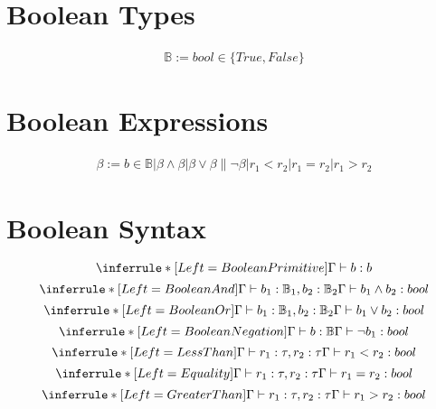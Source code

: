\documentclass{article}
\begin{document}
    \section{Boolean Types}
        \begin{align*}
            \mathbb{B} := bool \in \{True, False\}
        \end{align*}
    \section{Boolean Expressions}
        \begin{align*}
            \beta := b \in \mathbb{B}| \beta \wedge \beta|\beta \vee \beta\|\neg \beta|r_1 < r_2|r_1 = r_2|r_1 > r_2
        \end{align*}
    \section{Boolean Syntax}
        $$\inferrule*[Left=Boolean Primitive]{ }{\Gamma \vdash b:b}$$
        $$\inferrule*[Left=Boolean And]{\Gamma \vdash b_1:\mathbb{B}_1, b_2:\mathbb{B}_2}{\Gamma \vdash b_1 \wedge b_2:bool}$$
        $$\inferrule*[Left=Boolean Or]{\Gamma \vdash b_1:\mathbb{B}_1, b_2:\mathbb{B}_2}{\Gamma \vdash b_1 \vee b_2:bool}$$
        $$\inferrule*[Left=Boolean Negation]{\Gamma \vdash b:\mathbb{B}}{\Gamma \vdash \neg b_1:bool}$$
        $$\inferrule*[Left=Less Than]{\Gamma \vdash r_1:\tau, r_2:\tau}{\Gamma \vdash r_1 < r_2:bool}$$
        $$\inferrule*[Left=Equality]{\Gamma \vdash r_1:\tau, r_2:\tau}{\Gamma \vdash r_1 = r_2:bool}$$
        $$\inferrule*[Left=Greater Than]{\Gamma \vdash r_1:\tau, r_2:\tau}{\Gamma \vdash r_1 > r_2:bool}$$
\end{document}
